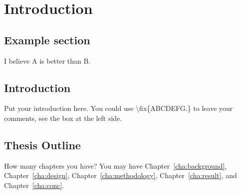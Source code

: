 \chapter{Introduction}
\label{cha:intro}


\section{Example section}
\label{sec:TODOexample_section_label}
I believe A is better than B.


\section{Introduction}
\label{sec:TODOproblemstatement}
Put your introduction here. You could use \textbackslash fix\{ABCDEFG.\} to
leave your comments, see the box at the left side.  



\section{Thesis Outline}
\label{sec:TODOoutline}
How many chapters you have? You may have Chapter~\ref{cha:background},
Chapter~\ref{cha:design}, Chapter~\ref{cha:methodology},
Chapter~\ref{cha:result}, and Chapter~\ref{cha:conc}.
